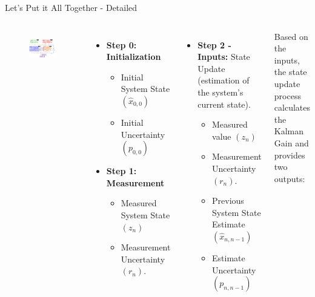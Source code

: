 \begin{frame}{Let's Put it All Together - Detailed}

\begin{columns}
        \begin{figure}
	   \centering
	   \includegraphics[width=1\textwidth]{Figures/Chapter1/DetailedKalmanFilterAlgorithm.png}
	   \label{fig:DetailedKalmanFilterAlgorithm}
	   \vspace{-10pt}
	   \end{figure}

	\begin{itemize}
	    \item \textbf{Step 0: Initialization}
	       \begin{itemize}
	           \item Initial System State $(\hat{x}_{0,0})$
	           \item Initial Uncertainty $(p_{0,0})$
	       \end{itemize} 
	    \item \textbf{Step 1: Measurement}
	        \begin{itemize}
	           \item Measured System State $(z_n)$
	           \item Measurement Uncertainty $(r_n)$. 
	       \end{itemize} 
	\end{itemize}
		
            \begin{itemize}
            \item \textbf{Step 2 - Inputs:} State Update (estimation of the system's current state). 
	        \begin{itemize}
	           \item Measured value $(z_n)$
	           \item Measurement Uncertainty $(r_n)$. 
	           \item Previous System State Estimate $(\hat{x}_{n,n-1})$
	           \item Estimate Uncertainty $(p_{n,n-1})$
	       \end{itemize} 
        \end{itemize}
	       Based on the inputs, the state update process calculates the Kalman Gain and provides two outputs:


\end{columns}
\end{frame}
